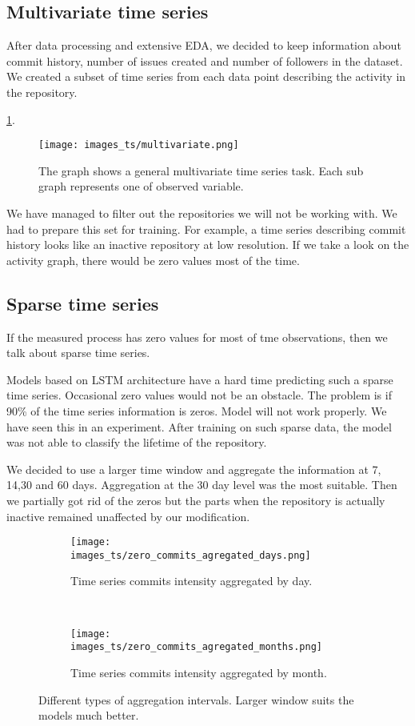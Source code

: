\documentclass[thesis=M,english]{FITthesis}[2019/12/23]
\begin{document}
\subsection{Multivariate time series}
After data processing and extensive EDA, we decided to keep information about commit history, number of issues created and number of followers in the dataset. We created a subset of time series from each data point describing the activity in the repository.  

\ref{fig:multivariate}.

\begin{figure}[ht!]
    \texttt{[image: images\_ts/multivariate.png]}
    \caption{The graph shows a general multivariate time series task. Each sub graph represents one of observed variable.} 
    \label{fig:multivariate}
    \centering
\end{figure}

We have managed to filter out the repositories we will not be working with. We had to prepare this set for training. For example, a time series describing commit history looks like an inactive repository at low resolution. If we take a look on the activity graph, there would be zero values most of the time.

\subsection{Sparse time series}

If the measured process has zero values for most of tme observations, then we talk about sparse time series.

Models based on LSTM architecture have a hard time predicting such a sparse time series. Occasional zero values would not be an obstacle. The problem is if 90\% of the time series information is zeros. Model will not work properly. We have seen this in an experiment. After training on such sparse data, the model was not able to classify the lifetime of the repository. 

We decided to use a larger time window and aggregate the information at 7, 14,30 and 60 days. Aggregation at the 30 day level was the most suitable. Then we partially got rid of the zeros but the parts when the repository is actually inactive remained unaffected by our modification.


\begin{figure*}[ht!]
    \centering
    \begin{subfigure}[t]{0.5\textwidth}
        \centering
        \texttt{[image: images\_ts/zero\_commits\_agregated\_days.png]}
        \caption{Time series commits intensity aggregated by day.}
    \end{subfigure}%
    ~ 
    \begin{subfigure}[t]{0.5\textwidth}
        \centering
        \texttt{[image: images\_ts/zero\_commits\_agregated\_months.png]}
        \caption{Time series commits intensity aggregated by month.}
    \end{subfigure}
    \caption{Different types of aggregation intervals. Larger window suits the models much better.}
\end{figure*}
\end{document}
